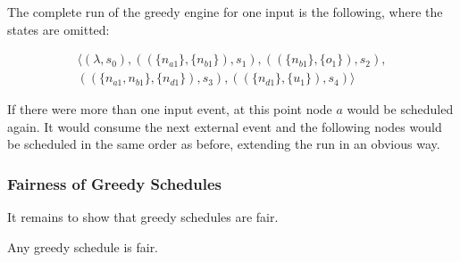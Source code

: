 The complete run of the greedy engine for one input is the following, where the states are omitted:

\begin{align*}
  \langle
    (\lambda,                             s_0),
    ((\{ n_{a1}         \}, \{n_{b1}\}),  s_1),
    ((\{ n_{b1}         \}, \{o_1\}),     s_2),\\
    ((\{ n_{a1}, n_{b1} \}, \{n_{d1}\}),  s_3),
    ((\{ n_{d1}         \}, \{u_1\}),     s_4)
  \rangle
\end{align*}

If there were more than one input event, at this point node \(a\) would be scheduled again.
It would consume the next external event and the following nodes would be scheduled in the same order as before, extending the run in an obvious way.

\subsubsection{Fairness of Greedy Schedules}
\label{sec:behaviours:without_timing:greedy:is_fair}

It remains to show that greedy schedules are fair.

\begin{lemma}[name = Greedy Schedules are Fair]\label{lemma:greedy_schedules_are_fair}
  Any greedy schedule is fair.
\end{lemma}

